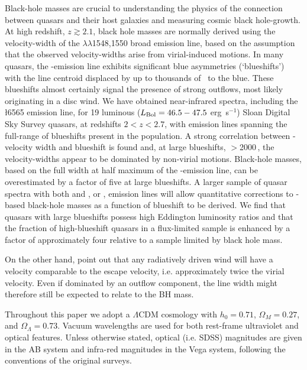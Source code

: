Black-hole masses are crucial to understanding the physics of the connection between quasars and their host galaxies and measuring cosmic black hole-growth. 
At high redshift, $z \gtrsim 2.1$, black hole masses are normally derived using the velocity-width of the $\lambda\lambda$1548,1550 broad emission line, based on the assumption that the observed velocity-widths arise from virial-induced motions.  
In many quasars, the -emission line exhibits significant blue asymmetries (`blueshifts') with the line centroid displaced by up to thousands of \kms\, to the blue. 
These blueshifts almost certainly signal the presence of strong outflows, most likely originating in a disc wind.
We have obtained near-infrared spectra, including the \ha\l6565 emission line, for 19 luminous ($L_{\rm Bol} = 46.5-47.5$ erg~s$^{-1}$) Sloan Digital Sky Survey quasars, at redshifts $2 < z < 2.7$, with  emission lines spanning the full-range of blueshifts present in the population.  
A strong correlation between -velocity width and blueshift is found and, at large blueshifts, $>$2000\,\kms, the velocity-widths appear to be dominated by non-virial motions. 
Black-hole masses, based on the full width at half maximum of the -emission line, can be overestimated by a factor of five at large blueshifts. 
A larger sample of quasar spectra with both  and \hbns, or \hans, emission lines will allow quantitative corrections to -based black-hole masses as a function of blueshift to be derived. 
We find that quasars with large  blueshifts possess high Eddington luminosity ratios and that the fraction of high-blueshift quasars in a flux-limited sample is enhanced by a factor of approximately four relative to a sample limited by black hole mass.    




On the other hand, \citet{denney13} point out that any radiatively driven wind will have a velocity comparable to the escape velocity, i.e. approximately twice the virial velocity.
Even if dominated by an outflow component, the  line width might therefore still be expected to relate to the BH mass. 








Throughout this paper we adopt a $\Lambda$CDM cosmology with $h_0=0.71$, $\Omega_M=0.27$, and $\Omega_\Lambda=0.73$. 
Vacuum wavelengths are used for both rest-frame ultraviolet and optical features.
Unless otherwise stated, optical (i.e. SDSS) magnitudes are given in the AB system and infra-red magnitudes in the Vega system, following the conventions of the original surveys. 




